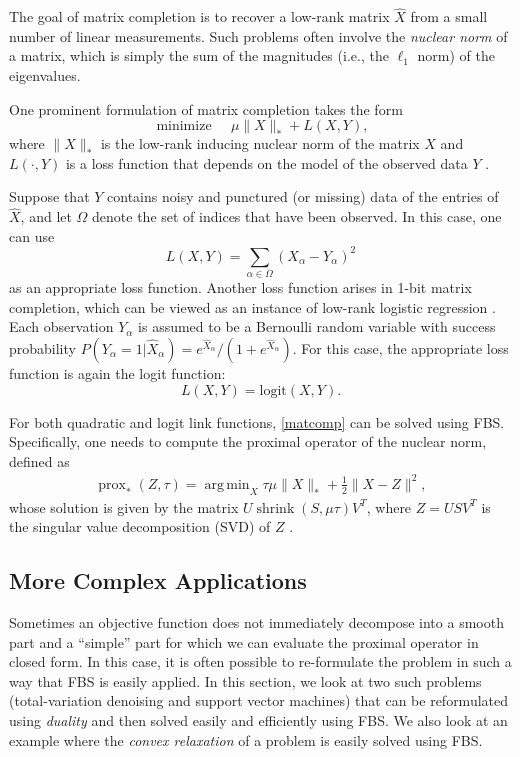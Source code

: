 \documentclass{amsart}
\newcommand{\half}{\frac{1}{2}}
\newcommand{\eqn}[2]{\begin{equation}\label{#1}#2\end{equation}}
\DeclareMathOperator*{\minimize}{minimize\quad}
\DeclareMathOperator*{\argmin}{arg\,min}
\DeclareMathOperator*{\shrink}{shrink}
\DeclareMathOperator{\prox}{prox}
\theoremstyle{definition}
\begin{document}
The goal of matrix completion is to recover a low-rank matrix $\hat X$ from a small number of linear measurements.  Such problems often involve the {\em nuclear norm} of a matrix, which is simply the sum of the magnitudes (i.e., the $\ell_1$ norm) of the eigenvalues.

  One prominent formulation of matrix completion takes the form
\eqn{matcomp}{\minimize \mu \| X \|_* + L(X,Y), }
where $ \| X \|_*$ is the low-rank inducing nuclear norm of the matrix $X$ and $L(\cdot,Y)$ is a loss function that depends on the model of the observed data $Y$ \cite{KMS09}.  
 
Suppose that $Y$ contains noisy and punctured (or missing) data of the entries of $\hat X$, and let $\Omega$ denote the set of indices that have been observed. In this case,  one can use 
  $$L(X,Y) = \sum_{\alpha\in\Omega} (X_\alpha - Y_\alpha)^2$$
as an appropriate loss function.
Another loss function arises in 1-bit matrix completion, which can be viewed as an instance of low-rank logistic regression  \cite{DPVW13}. Each observation $Y_\alpha$ is assumed to be a Bernoulli random variable with success probability 
 $P(Y_\alpha=1| \hat X_\alpha)=e^{\hat X_\alpha}/(1+e^{\hat X_\alpha}).$
For this case, the appropriate loss function is again the logit function: $$ L(X,Y)  = \mathrm{logit}(X,Y).$$  
 
For both quadratic and logit link functions, \eqref{matcomp} can be solved using FBS. Specifically, one needs to compute the proximal operator of the nuclear norm, defined as
\begin{align} \label{eq:nucnormproxy}
 \prox_*(Z,\tau) = \argmin_X \tau  \mu\|X\|_* + \half \|X-Z\|^2,
\end{align}
whose solution is given by the matrix $U \shrink(S,\mu\tau)V^T$, where  $Z=USV^T$ is the singular value decomposition (SVD) of $Z$ \cite{DPVW13}.




\subsection{More Complex Applications}    
Sometimes an objective function does not immediately decompose into a smooth part and a ``simple'' part  for which we can evaluate the proximal operator in closed form.  In this case, it is often possible to re-formulate the problem in such a way that  FBS is easily applied.  In this section, we look at two such problems (total-variation denoising and support vector machines) that can be reformulated using {\em duality} and then solved easily and efficiently  using FBS.  We also look at an example where the {\em convex relaxation} of a problem is easily solved using FBS.
\end{document}
